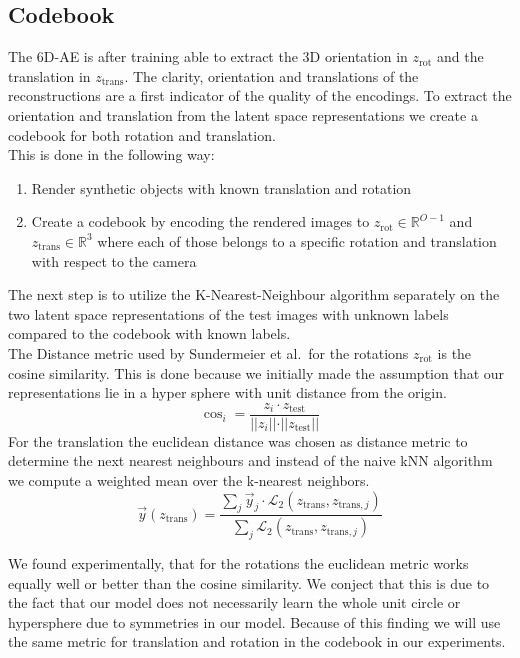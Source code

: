 \documentclass[10pt,a4paper]{article}
\newcommand{\rot}{\ensuremath{\text{rot}\xspace}}
\newcommand{\trans}{\ensuremath{\text{trans}\xspace}}
\begin{document}
\subsection{Codebook}\label{Codebook}
The 6D-AE is after training able to extract the 3D orientation in $z_{\rot}$ and the translation in $z_{\trans}$. The clarity, orientation and translations of the reconstructions are a first indicator of the quality of the encodings. To extract the orientation and translation from the latent space representations we create a codebook for both rotation and translation.\\
This is done in the following way:
\begin{enumerate}
    \item Render synthetic objects with known translation and rotation\\
    \item Create a codebook by encoding the rendered images to $z_{\rot}\in \mathbb{R}^{O-1}$ and $z_{\trans} \in \mathbb{R}^3$ where each of those belongs to a specific rotation and translation with respect to the camera
\end{enumerate}
The next step is to utilize the K-Nearest-Neighbour algorithm separately on the two latent space representations of the test images with unknown labels compared to the codebook with known labels.\\
The Distance metric used by Sundermeier et al.~for the rotations $z_{\rot}$ is the cosine similarity. This is done because we initially made the assumption that our representations lie in a hyper sphere with unit distance from the origin.
\begin{equation}
    \cos_i = \dfrac{z_i \cdot z_{\text{test}}}{ \vert\vert  z_i \vert \vert \cdot \vert \vert z_{\text{test}} \vert \vert }
\end{equation}
For the translation the euclidean distance was chosen as distance metric to
determine the next nearest neighbours and instead of the naive kNN algorithm we
compute a weighted mean over the k-nearest neighbors.
\begin{equation}
    \vec{y}(z_{\trans}) = \dfrac{\sum_j  \vec{y}_j  \cdot
    \mathcal{L}_2(z_{\trans},z_{\trans , j}) }{\sum_j \mathcal{L}_2(z_{\trans},z_{\trans , j})}
\end{equation}

We found experimentally, that for the rotations the euclidean metric works
equally well or better than the cosine similarity. We conject that this is due
to the fact that our model does not necessarily learn the whole unit circle or
hypersphere due to symmetries in our model. Because of this finding we will use
the same metric for translation and rotation in the codebook in our
experiments.
\end{document}
